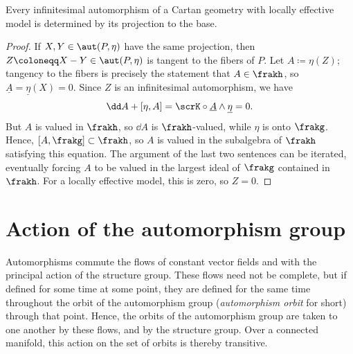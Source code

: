 \begin{prop}
    Every infinitesimal automorphism of a Cartan geometry with locally effective model is determined by its projection to the base.
\end{prop}
\begin{proof}
    If $X,Y\in\aut(P,\eta)$ have the same projection, then $Z\coloneqq X-Y\in\aut(P,\eta)$ is tangent to the fibers of $P$. Let $A\coloneqq \eta(Z)$; tangency to the fibers is precisely the statement that $A\in \frakh$, so $\underline{A}=\underline{\eta}(X)=0$. Since $Z$ is an infinitesimal automorphism, we have 
    \[\dd A+[\eta,A]=\scrK\circ \underline{A}\wedge \underline{\eta}=0.\]
    But $A$ is valued in $\frakh$, so $\dd A$ is $\frakh$-valued, while $\eta$ is onto $\frakg$. Hence, $[A,\frakg]\subset \frakh$, so $A$ is valued in the subalgebra of $\frakh$ satisfying this equation. The argument of the last two sentences can be iterated, eventually forcing $A$ to be valued in the largest ideal of $\frakg$ contained in $\frakh$. For a locally effective model, this is zero, so $Z=0$.
\end{proof}






\section{Action of the automorphism group}

Automorphisms commute the flows of constant vector fields and with the principal action of the structure group. These flows need not be complete, but if defined for some time at some point, they are defined for the same time throughout the orbit of the automorphism group (\emph{automorphism orbit} for short) through that point. Hence, the orbits of the automorphism group are taken to one another by these flows, and by the structure group. Over a connected manifold, this action on the set of orbits is thereby transitive.

